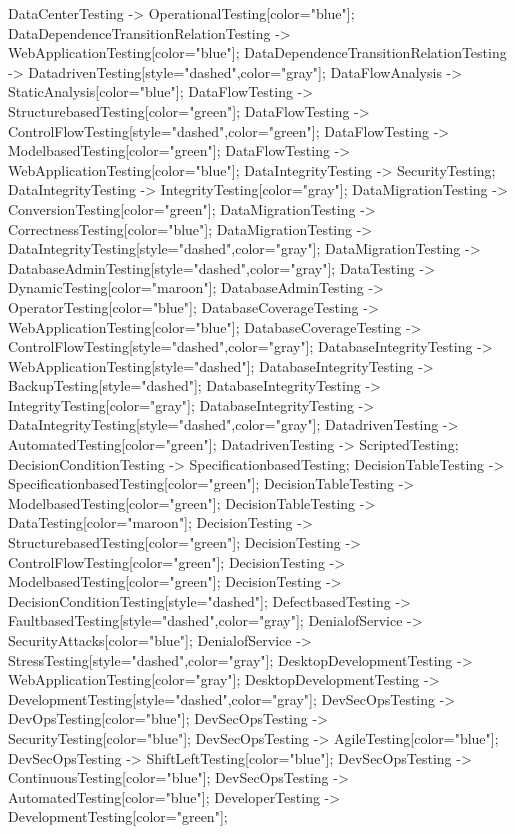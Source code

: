 \documentclass{article}
\begin{document}
{DataCenterTesting -> OperationalTesting[color="blue"];
DataDependenceTransitionRelationTesting -> WebApplicationTesting[color="blue"];
DataDependenceTransitionRelationTesting -> DatadrivenTesting[style="dashed",color="gray"];
DataFlowAnalysis -> StaticAnalysis[color="blue"];
DataFlowTesting -> StructurebasedTesting[color="green"];
DataFlowTesting -> ControlFlowTesting[style="dashed",color="green"];
DataFlowTesting -> ModelbasedTesting[color="green"];
DataFlowTesting -> WebApplicationTesting[color="blue"];
DataIntegrityTesting -> SecurityTesting;
DataIntegrityTesting -> IntegrityTesting[color="gray"];
DataMigrationTesting -> ConversionTesting[color="green"];
DataMigrationTesting -> CorrectnessTesting[color="blue"];
DataMigrationTesting -> DataIntegrityTesting[style="dashed",color="gray"];
DataMigrationTesting -> DatabaseAdminTesting[style="dashed",color="gray"];
DataTesting -> DynamicTesting[color="maroon"];
DatabaseAdminTesting -> OperatorTesting[color="blue"];
DatabaseCoverageTesting -> WebApplicationTesting[color="blue"];
DatabaseCoverageTesting -> ControlFlowTesting[style="dashed",color="gray"];
DatabaseIntegrityTesting -> WebApplicationTesting[style="dashed"];
DatabaseIntegrityTesting -> BackupTesting[style="dashed"];
DatabaseIntegrityTesting -> IntegrityTesting[color="gray"];
DatabaseIntegrityTesting -> DataIntegrityTesting[style="dashed",color="gray"];
DatadrivenTesting -> AutomatedTesting[color="green"];
DatadrivenTesting -> ScriptedTesting;
DecisionConditionTesting -> SpecificationbasedTesting;
DecisionTableTesting -> SpecificationbasedTesting[color="green"];
DecisionTableTesting -> ModelbasedTesting[color="green"];
DecisionTableTesting -> DataTesting[color="maroon"];
DecisionTesting -> StructurebasedTesting[color="green"];
DecisionTesting -> ControlFlowTesting[color="green"];
DecisionTesting -> ModelbasedTesting[color="green"];
DecisionTesting -> DecisionConditionTesting[style="dashed"];
DefectbasedTesting -> FaultbasedTesting[style="dashed",color="gray"];
DenialofService -> SecurityAttacks[color="blue"];
DenialofService -> StressTesting[style="dashed",color="gray"];
DesktopDevelopmentTesting -> WebApplicationTesting[color="gray"];
DesktopDevelopmentTesting -> DevelopmentTesting[style="dashed",color="gray"];
DevSecOpsTesting -> DevOpsTesting[color="blue"];
DevSecOpsTesting -> SecurityTesting[color="blue"];
DevSecOpsTesting -> AgileTesting[color="blue"];
DevSecOpsTesting -> ShiftLeftTesting[color="blue"];
DevSecOpsTesting -> ContinuousTesting[color="blue"];
DevSecOpsTesting -> AutomatedTesting[color="blue"];
DeveloperTesting -> DevelopmentTesting[color="green"];
}
\end{document}
